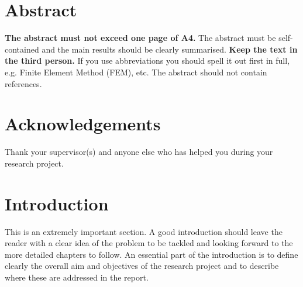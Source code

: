 \documentclass[a4paper,12pt]{article}
\begin{document}
\frontMatter


\section*{Abstract}
\label{sec:abstract}

\textbf{The abstract must not exceed one page of A4.} The abstract must be self-contained and the main results should be clearly summarised. \textbf{Keep the text in the third person.} If you use abbreviations you should spell it out first in full, e.g. Finite Element Method (FEM), etc. The abstract should not contain references.


\clearpage


\section*{Acknowledgements}
\label{sec:ack}

Thank your supervisor(s) and anyone else who has helped you during your research project.


\clearpage


\tableofcontents{\thispagestyle{fancyplain}} %


\clearpage


\section{Introduction}
\label{sec:introduction}

This is an extremely important section. A good introduction should leave the reader with a clear idea of the problem to be tackled and looking forward to the more detailed chapters to follow. An essential part of the introduction is to define clearly the overall aim and objectives of the research project and to describe where these are addressed in the report.
\end{document}

